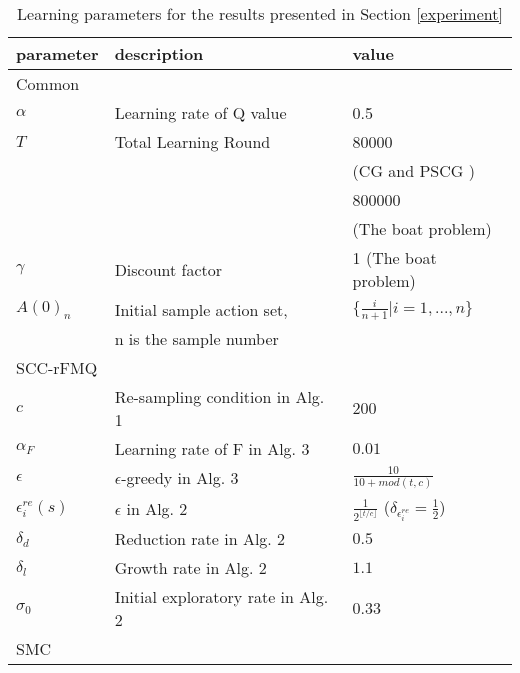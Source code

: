 \documentclass[journal,transmag]{IEEEtran}
\begin{document}
\begin{table}[h!]
\caption{Learning parameters for the results presented in Section \ref{experiment}}
\label{tab-parameter}
\centering
\begin{tabular}{l|l|l}
\hline
\hline
  parameter   & description &   value    \\
\hline
\multicolumn{3}{l}{Common} \\
\hline
  $\alpha$              &  Learning rate of Q value   &   0.5                              \\
  $T$                   &  Total Learning Round       &   80000 \\
                        &                             &   (CG and PSCG )  \\
                        &                             &   800000 \\
                        &                             &   (The boat problem)             \\
  $\gamma$              &  Discount factor            &   1 (The boat problem)              \\
  $A(0)_n$              &  Initial sample action set,            &   $\{\frac{i}{n+1}| i=1,...,n\}$\\
                        &  n is the sample number                &                                  \\
\hline
\multicolumn{3}{l}{SCC-rFMQ} \\
\hline
  $c$                   &  Re-sampling condition in Alg. 1       &   $200$                               \\
  $\alpha_F$            &  Learning rate of F in Alg. 3          &   $0.01$                               \\
  $\epsilon$            &  $\epsilon$-greedy in Alg. 3           &   $\frac{10}{10+mod(t,c)}$ \\
  $\epsilon_i^{re}(s)$  &  $\epsilon$ in Alg. 2                  &   $\frac{1}{2^{\lfloor t/c\rfloor}}$ ($\delta_{\epsilon_i^{re}}=\frac{1}{2}$)  \\
  $\delta_d$            &  Reduction rate in Alg. 2              &   $0.5$              \\
  $\delta_l$            &  Growth  rate in Alg. 2                &   $1.1$              \\
  $\sigma_0$            &  Initial exploratory rate in Alg. 2    &   $0.33$             \\
\hline
\multicolumn{3}{l}{SMC} \\

\end{tabular}
\end{table}
\end{document}
